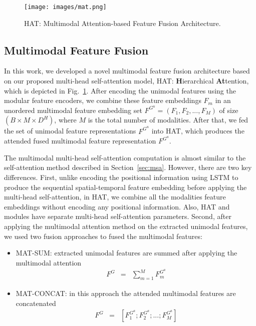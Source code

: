 \documentclass[runningheads]{llncs}
\newcommand{\hattn}{HAT}
\newcommand{\fhattn}{HAT: \textbf{H}ierarchical \textbf{At}tention}
\begin{document}
\begin{figure}[!t]
    \centering
    \texttt{[image: images/mat.png]}
    \caption{{\hattn :} Multimodal Attention-based Feature Fusion Architecture.}
    \label{fig:mma}
     \vspace{-0.2in}
\end{figure}

\subsection{Multimodal Feature Fusion}
\label{sec:mat}

In this work, we developed a novel multimodal feature fusion architecture based on our proposed multi-head self-attention model, \fhattn, which is depicted in Fig.~\ref{fig:mma}. After encoding the unimodal features using the modular feature encoders, we combine these feature embeddings $F_{m}$ in an unordered multimodal feature embedding set $F^{G^u}=(F_1, F_2,..., F_{M})$ of size $(B\times M \times D^{H})$, where $M$ is the total number of modalities. After that, we fed the set of unimodal feature representations $F^{G^u}$ into \hattn, which produces the attended fused multimodal feature representation $F^{G^a}$. 


The multimodal multi-head self-attention computation is almost similar to the self-attention method described in Section~\ref{sec:msa}. However, there are two key differences. First, unlike encoding the positional information using LSTM to produce the sequential spatial-temporal feature embedding before applying the multi-head self-attention, in {\hattn}, we combine all the modalities feature embeddings without encoding any positional information. Also, {\hattn } and {\uat } modules have separate multi-head self-attention parameters. Second, after applying the multimodal attention method on the extracted unimodal features, we used two fusion approaches to fused the multimodal features:


\begin{itemize}
    \item MAT-SUM: extracted unimodal features are summed after applying the multimodal attention
    \begin{eqnarray}
       F^{G} &=& \sum_{m=1}^{M} F^{G^a}_m
    \end{eqnarray}
    \item MAT-CONCAT: in this approach the attended multimodal features are concatenated
    \begin{eqnarray}
F^{G} &=& [F^{G^a}_1;F^{G^a}_2;...;F^{G^a}_{M}]
    \end{eqnarray}
\end{itemize}
\end{document}
